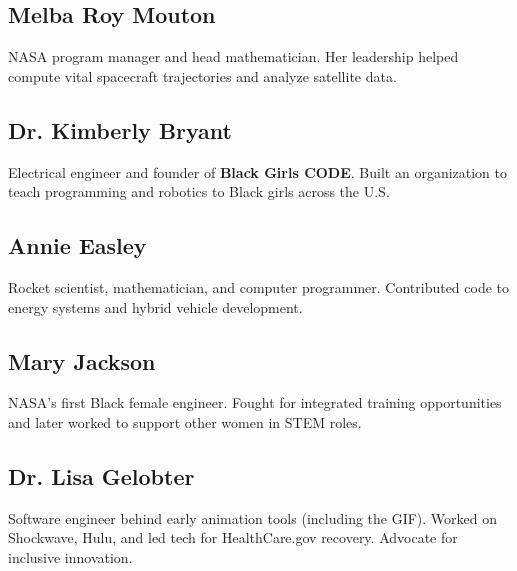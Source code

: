 \documentclass[12pt]{article}
\begin{document}
\subsection*{Melba Roy Mouton}
NASA program manager and head mathematician. Her leadership helped compute vital spacecraft trajectories and analyze satellite data.

\subsection*{Dr. Kimberly Bryant}
Electrical engineer and founder of \textbf{Black Girls CODE}. Built an organization to teach programming and robotics to Black girls across the U.S.

\subsection*{Annie Easley}
Rocket scientist, mathematician, and computer programmer. Contributed code to energy systems and hybrid vehicle development.

\subsection*{Mary Jackson}
NASA’s first Black female engineer. Fought for integrated training opportunities and later worked to support other women in STEM roles.

\subsection*{Dr. Lisa Gelobter}
Software engineer behind early animation tools (including the GIF). Worked on Shockwave, Hulu, and led tech for HealthCare.gov recovery. Advocate for inclusive innovation.
\end{document}
